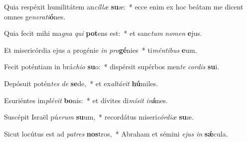 \item Quia respéxit humilitátem an\textit{cíl}\textit{læ} \textbf{su}æ:~* ecce enim ex hoc beátam me dicent omnes ge\textit{ne}\textit{ra}\textit{ti}\textbf{ó}nes.
\item Quia fecit mihi ma\textit{gna} \textit{qui} \textbf{pot}ens est:~* et sanc\textit{tum} \textit{no}\textit{men} \textbf{e}jus.
\item Et misericórdia ejus a progénie \textit{in} \textit{pro}\textbf{gé}nies~* ti\textit{mén}\textit{ti}\textit{bus} \textbf{e}um.
\item Fecit poténtiam in brá\textit{chi}\textit{o} \textbf{su}o:~* dispérsit supérbos men\textit{te} \textit{cor}\textit{dis} \textbf{su}i.
\item Depósuit potén\textit{tes} \textit{de} \textbf{se}de,~* et ex\textit{al}\textit{tá}\textit{vit} \textbf{hú}miles.
\item Esuriéntes im\textit{plé}\textit{vit} \textbf{bo}nis:~* et dívites di\textit{mí}\textit{sit} \textit{in}\textbf{á}nes.
\item Suscépit Israël pú\textit{e}\textit{rum} \textbf{su}um,~* recordátus miseri\textit{cór}\textit{di}\textit{æ} \textbf{su}æ.
\item Sicut locútus est ad \textit{pa}\textit{tres} \textbf{nos}tros,~* Abraham et sémini \textit{e}\textit{jus} \textit{in} \textbf{sǽ}cula.
